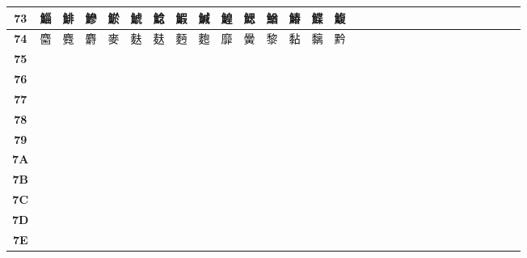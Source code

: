 \begin{table}[H]
\begin{tabular}{|Sc|Sc|Sc|Sc|Sc|Sc|Sc|Sc|Sc|Sc|Sc|Sc|Sc|Sc|Sc|}
\textbf{73} & 鯔 & 鯡 & 鰺 & 鯲 & 鯱 & 鯰 & 鰕 & 鰔 & 鰉 & 鰓 & 鰌 & 鰆 & 鰈 & 鰒 \\ \hline
\textbf{74} & 麕 & 麑 & 麝 & 麥 & 麩 & 麸 & 麪 & 麭 & 靡 & 黌 & 黎 & 黏 & 黐 & 黔 \\ \hline
\textbf{75} &  &  &  &  &  &  &  &  &  &  &  &  &  &  \\ \hline
\textbf{76} &  &  &  &  &  &  &  &  &  &  &  &  &  &  \\ \hline
\textbf{77} &  &  &  &  &  &  &  &  &  &  &  &  &  &  \\ \hline
\textbf{78} &  &  &  &  &  &  &  &  &  &  &  &  &  &  \\ \hline
\textbf{79} &  &  &  &  &  &  &  &  &  &  &  &  &  &  \\ \hline
\textbf{7A} &  &  &  &  &  &  &  &  &  &  &  &  &  &  \\ \hline
\textbf{7B} &  &  &  &  &  &  &  &  &  &  &  &  &  &  \\ \hline
\textbf{7C} &  &  &  &  &  &  &  &  &  &  &  &  &  &  \\ \hline
\textbf{7D} &  &  &  &  &  &  &  &  &  &  &  &  &  &  \\ \hline
\textbf{7E} &  &  &  &  &  &  &  &  &  &  &  &  &  &  \\ \hline
\end{tabular}
\end{table}

